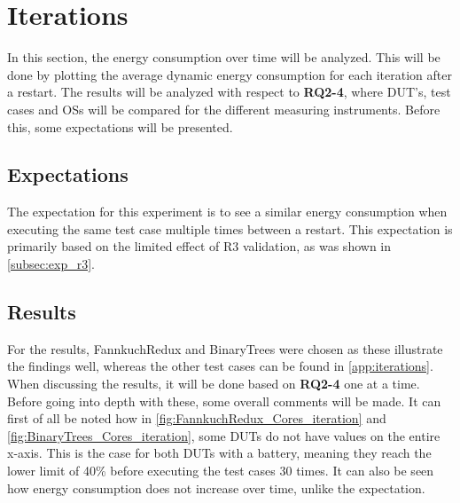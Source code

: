 \section{Iterations}\label{sec:iterations}

In this section, the energy consumption over time will be analyzed. This will be done by plotting the average dynamic energy consumption for each iteration after a restart. The results will be analyzed with respect to \textbf{RQ2-4}, where DUT's, test cases and OSs will be compared for the different measuring instruments. Before this, some expectations will be presented.

\subsection{Expectations}

The expectation for this experiment is to see a similar energy consumption when executing the same test case multiple times between a restart. This expectation is primarily based on the limited effect of R3 validation, as was shown in \cref*{subsec:exp_r3}.

\subsection{Results}

For the results, FannkuchRedux and BinaryTrees were chosen as these illustrate the findings well, whereas the other test cases can be found in \cref{app:iterations}. When discussing the results, it will be done based on \textbf{RQ2-4} one at a time. Before going into depth with these, some overall comments will be made. It can first of all be noted how in \cref{fig:FannkuchRedux_Cores_iteration} and \cref{fig:BinaryTrees_Cores_iteration}, some DUTs do not have values on the entire x-axis. This is the case for both DUTs with a battery, meaning they reach the lower limit of 40\% before executing the test cases 30 times. It can also be seen how energy consumption does not increase over time, unlike the expectation. 



